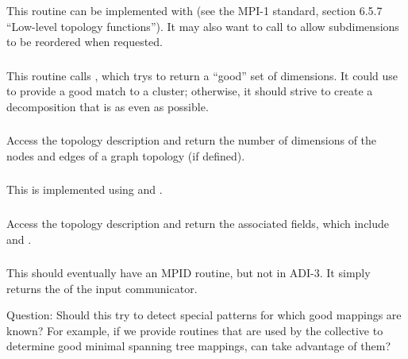 \documentclass{article}
\begin{document}
\subsubsection{}
This routine can be implemented with  (see the MPI-1
standard, section 6.5.7 ``Low-level topology functions'').  It may also
want to call  to allow subdimensions to be reordered
when requested.

\subsubsection{}
This routine calls , which trys to return a
``good'' set of dimensions.  It could use  to
provide a good match to a cluster; otherwise, it should strive to create a
decomposition that is as even as possible.

\subsubsection{}
Access the topology description and return the number of dimensions of
the nodes and edges of a graph topology (if defined).

\subsubsection{}
This is implemented using  and
. 

\subsubsection{}
Access the topology description and return the associated fields, which
include  and
. 

\subsubsection{}
This should eventually have an MPID routine, but not in ADI-3.  It simply
returns the  of the input communicator.

Question: Should this try to detect special patterns for which good mappings
are known?  For example, if we provide routines that are used by the
collective to determine good minimal spanning tree mappings, can
 take advantage of them?
\end{document}
